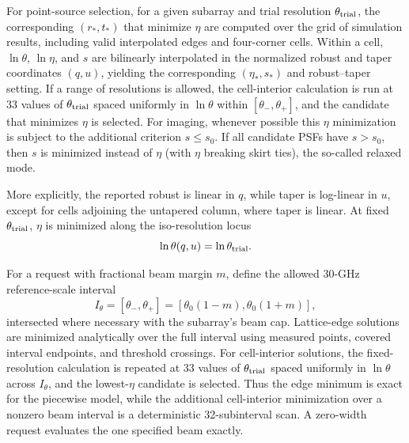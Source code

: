 \documentclass[11pt]{article}
\begin{document}
For point-source selection, for a given subarray and trial resolution
$\theta_{\rm trial}$, the corresponding $(r_*,t_*)$ that minimize $\eta$ are
computed over the grid of simulation results, including valid interpolated
edges and four-corner cells.  Within a cell, $\ln\theta$, $\ln\eta$, and $s$
are bilinearly interpolated in the normalized robust and taper coordinates
$(q,u)$, yielding the corresponding $(\eta_*,s_*)$ and robust--taper setting.
If a range of resolutions is allowed, the cell-interior calculation is run at
33 values of $\theta_{\rm trial}$ spaced uniformly in $\ln\theta$ within
$[\theta_-,\theta_+]$, and the candidate that minimizes $\eta$ is selected.
For imaging, whenever possible this $\eta$ minimization is subject to the
additional criterion $s\le s_0$.  If all candidate PSFs have $s>s_0$, then
$s$ is minimized instead of $\eta$ (with $\eta$ breaking skirt ties), the
so-called relaxed mode.

More explicitly, the reported robust is linear in $q$, while taper is
log-linear in $u$, except for cells adjoining the untapered column, where
taper is linear.  At fixed $\theta_{\rm trial}$, $\eta$ is minimized along the
iso-resolution locus
\begin{equation}
  \ln\theta(q,u)=\ln\theta_{\rm trial}.
\end{equation}

For a request with fractional beam margin $m$, define the allowed 30-GHz
reference-scale interval
\begin{equation}
 I_\theta=[\theta_-,\theta_+]
          =[\theta_0(1-m),\theta_0(1+m)],
\end{equation}
intersected where necessary with the subarray's beam cap.  Lattice-edge
solutions are minimized analytically over the full interval using measured
points, covered interval endpoints, and threshold crossings.  For
cell-interior solutions, the fixed-resolution calculation is repeated at 33
values of $\theta_{\rm trial}$ spaced uniformly in $\ln\theta$ across
$I_\theta$, and the lowest-$\eta$ candidate is selected.  Thus the edge
minimum is exact for the piecewise model, while the additional cell-interior
minimization over a nonzero beam interval is a deterministic 32-subinterval
scan.  A zero-width request evaluates the one specified beam exactly.
\end{document}
